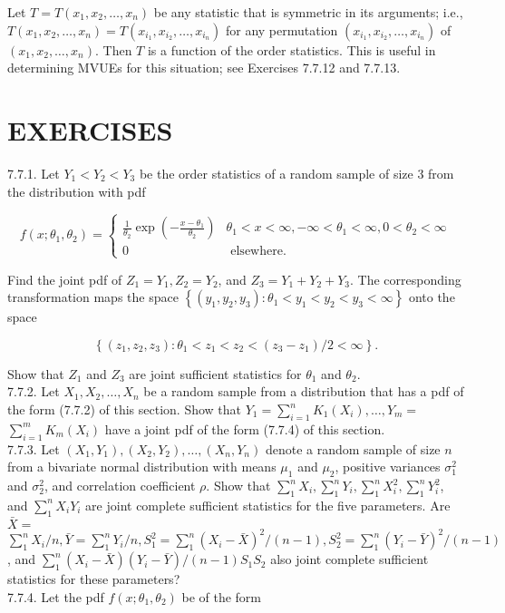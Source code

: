 Let $T=T\left(x_{1}, x_{2}, \ldots, x_{n}\right)$ be any statistic that is symmetric in its arguments; i.e., $T\left(x_{1}, x_{2}, \ldots, x_{n}\right)=T\left(x_{i_{1}}, x_{i_{2}}, \ldots, x_{i_{n}}\right)$ for any permutation $\left(x_{i_{1}}, x_{i_{2}}, \ldots, x_{i_{n}}\right)$ of $\left(x_{1}, x_{2}, \ldots, x_{n}\right)$. Then $T$ is a function of the order statistics. This is useful in determining MVUEs for this situation; see Exercises 7.7.12 and 7.7.13.

\section*{EXERCISES}
7.7.1. Let $Y_{1}<Y_{2}<Y_{3}$ be the order statistics of a random sample of size 3 from the distribution with pdf

$$
f\left(x ; \theta_{1}, \theta_{2}\right)= \begin{cases}\frac{1}{\theta_{2}} \exp \left(-\frac{x-\theta_{1}}{\theta_{2}}\right) & \theta_{1}<x<\infty,-\infty<\theta_{1}<\infty, 0<\theta_{2}<\infty \\ 0 & \text { elsewhere. }\end{cases}
$$

Find the joint pdf of $Z_{1}=Y_{1}, Z_{2}=Y_{2}$, and $Z_{3}=Y_{1}+Y_{2}+Y_{3}$. The corresponding transformation maps the space $\left\{\left(y_{1}, y_{2}, y_{3}\right): \theta_{1}<y_{1}<y_{2}<y_{3}<\infty\right\}$ onto the space

$$
\left\{\left(z_{1}, z_{2}, z_{3}\right): \theta_{1}<z_{1}<z_{2}<\left(z_{3}-z_{1}\right) / 2<\infty\right\} .
$$

Show that $Z_{1}$ and $Z_{3}$ are joint sufficient statistics for $\theta_{1}$ and $\theta_{2}$.\\
7.7.2. Let $X_{1}, X_{2}, \ldots, X_{n}$ be a random sample from a distribution that has a pdf of the form (7.7.2) of this section. Show that $Y_{1}=\sum_{i=1}^{n} K_{1}\left(X_{i}\right), \ldots, Y_{m}=$ $\sum_{i=1}^{m} K_{m}\left(X_{i}\right)$ have a joint pdf of the form (7.7.4) of this section.\\
7.7.3. Let $\left(X_{1}, Y_{1}\right),\left(X_{2}, Y_{2}\right), \ldots,\left(X_{n}, Y_{n}\right)$ denote a random sample of size $n$ from a bivariate normal distribution with means $\mu_{1}$ and $\mu_{2}$, positive variances $\sigma_{1}^{2}$ and $\sigma_{2}^{2}$, and correlation coefficient $\rho$. Show that $\sum_{1}^{n} X_{i}, \sum_{1}^{n} Y_{i}, \sum_{1}^{n} X_{i}^{2}, \sum_{1}^{n} Y_{i}^{2}$, and $\sum_{1}^{n} X_{i} Y_{i}$ are joint complete sufficient statistics for the five parameters. Are $\bar{X}=$ $\sum_{1}^{n} X_{i} / n, \bar{Y}=\sum_{1}^{n} Y_{i} / n, S_{1}^{2}=\sum_{1}^{n}\left(X_{i}-\bar{X}\right)^{2} /(n-1), S_{2}^{2}=\sum_{1}^{n}\left(Y_{i}-\bar{Y}\right)^{2} /(n-1)$, and $\sum_{1}^{n}\left(X_{i}-\bar{X}\right)\left(Y_{i}-\bar{Y}\right) /(n-1) S_{1} S_{2}$ also joint complete sufficient statistics for these parameters?\\
7.7.4. Let the pdf $f\left(x ; \theta_{1}, \theta_{2}\right)$ be of the form

